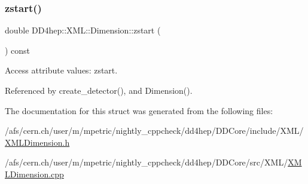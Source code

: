 \subsubsection{\texorpdfstring{zstart()}{zstart()}}
{\footnotesize\ttfamily double D\+D4hep\+::\+X\+M\+L\+::\+Dimension\+::zstart (\begin{DoxyParamCaption}{ }\end{DoxyParamCaption}) const}



Access attribute values\+: zstart. 



Referenced by create\+\_\+detector(), and Dimension().



The documentation for this struct was generated from the following files\+:\begin{DoxyCompactItemize}
\item 
/afs/cern.\+ch/user/m/mpetric/nightly\+\_\+cppcheck/dd4hep/\+D\+D\+Core/include/\+X\+M\+L/\hyperlink{_x_m_l_dimension_8h}{X\+M\+L\+Dimension.\+h}\item 
/afs/cern.\+ch/user/m/mpetric/nightly\+\_\+cppcheck/dd4hep/\+D\+D\+Core/src/\+X\+M\+L/\hyperlink{_x_m_l_dimension_8cpp}{X\+M\+L\+Dimension.\+cpp}\end{DoxyCompactItemize}
